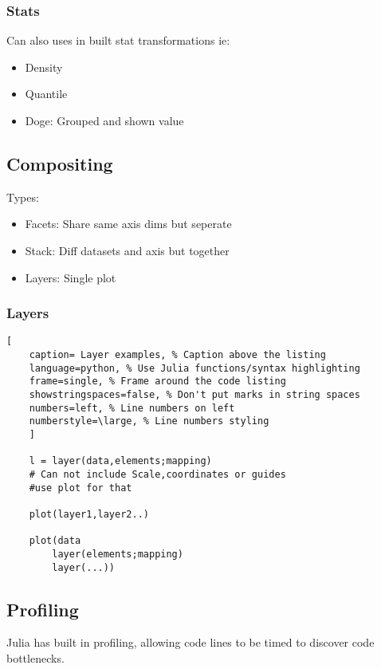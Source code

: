 \documentclass[11pt]{scrartcl} %
\begin{document}
\subsubsection{Stats}

Can also uses in built stat transformations ie:

\begin{itemize}
	\item Density 
	\item Quantile
	\item Doge: Grouped and shown value
\end{itemize}

\subsection{Compositing}

Types:
\begin{itemize}
	\item Facets: Share same axis dims but seperate
	\item Stack: Diff datasets and axis but together
	\item Layers: Single plot
\end{itemize}

\subsubsection{Layers}

\begin{lstlisting}[
	caption= Layer examples, % Caption above the listing
	language=python, % Use Julia functions/syntax highlighting
	frame=single, % Frame around the code listing
	showstringspaces=false, % Don't put marks in string spaces
	numbers=left, % Line numbers on left
	numberstyle=\large, % Line numbers styling
	]

	l = layer(data,elements;mapping) 
	# Can not include Scale,coordinates or guides
	#use plot for that

	plot(layer1,layer2..)

	plot(data
		layer(elements;mapping)
		layer(...))

\end{lstlisting}

\subsection{Profiling}

Julia has built in profiling, allowing code lines to be timed to discover code bottlenecks.\\
\end{document}
